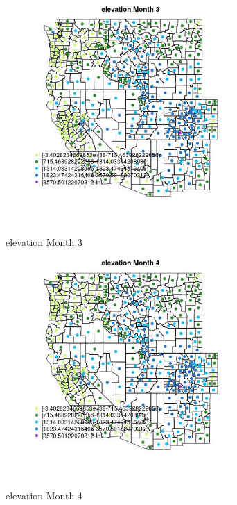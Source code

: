 \begin{figure} 
\centering  
\includegraphics[width=0.77\textwidth]{Code_Outputs/df_report_ML_predictors_CountyCentroid_Locations_Dates_2008-01-01to2018-12-31_MapObsMo3elevation.jpg} 
\caption{\label{fig:df_report_ML_predictors_CountyCentroid_Locations_Dates_2008-01-01to2018-12-31MapObsMo3elevation}elevation Month 3} 
\end{figure} 
 

\begin{figure} 
\centering  
\includegraphics[width=0.77\textwidth]{Code_Outputs/df_report_ML_predictors_CountyCentroid_Locations_Dates_2008-01-01to2018-12-31_MapObsMo4elevation.jpg} 
\caption{\label{fig:df_report_ML_predictors_CountyCentroid_Locations_Dates_2008-01-01to2018-12-31MapObsMo4elevation}elevation Month 4} 
\end{figure} 
 

